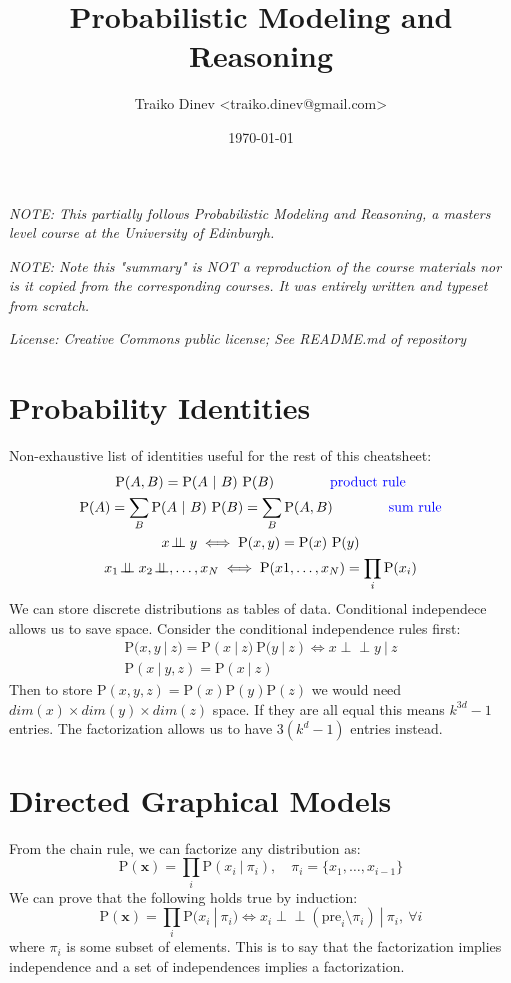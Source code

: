 \documentclass{article}
\title{Probabilistic Modeling and Reasoning}
\date{\today}
\author{Traiko Dinev \textless traiko.dinev@gmail.com\textgreater}
\newcommand{\prob}{\text{P}}
\newcommand{\pr}{\prob}
\newcommand{\pre}{\text{pre}_i}
\renewcommand{\vec}[1]{\mathbf{#1}}
\newcommand{\bx}{\vec{x}}
\newcommand{\giv}{\ |\ }
\newcommand{\blue}[1]{\textcolor{blue}{#1}}
\newcommand\indep{\!\perp\!\!\!\perp}
\begin{document}
\maketitle
\textit{NOTE: This partially follows Probabilistic Modeling and Reasoning, a masters level course at the University of Edinburgh.}

\textit{NOTE: Note this "summary" is NOT a reproduction of the course materials nor is it copied from the corresponding courses. It was entirely written and typeset from scratch.}

\textit{License: Creative Commons public license; See README.md of repository}

\section{Probability Identities}
Non-exhaustive list of identities useful for the rest of this cheatsheet:
% 
\begin{gather*}
    \pr(A,B) = \pr(A \giv B)\ \pr(B) 
        \qquad \tag*{\blue{product rule}}\\
    \pr(A) = \sum_B \pr(A \giv B)\ \pr(B) = 
        \sum_B \pr(A,B) \qquad \tag*{\blue{sum rule}} \\
    x \indep y \iff \pr(x, y) = \pr(x)\ \pr(y) \\
    x_1 \indep x_2 \indep, \dots , x_N \iff 
        \pr(x1, \dots, x_N)  = \prod_i \pr(x_i)
\end{gather*}
% 
We can store discrete distributions as tables of data. Conditional independece allows us to save space. Consider the conditional independence rules first:
% 
\begin{gather*}
    \pr(x, y \giv z) = \pr(x \giv z)\ \pr(y \giv z)
        \iff x \indep y \giv z \\
    \pr(x \giv y, z) = \pr(x \giv z)
\end{gather*}
% 
Then to store $\pr(x, y, z) = \pr(x) \pr(y) \pr(z)$ we would need $dim(x) \times dim(y) \times dim(z)$ space. If they are all equal this means $k^{3d} - 1$ entries. The factorization allows us to have $3(k^d - 1)$ entries instead.

\section{Directed Graphical Models}
From the chain rule, we can factorize any distribution as:
% 
\begin{equation*}
    \pr(\bx) = \prod_i \pr(x_i \giv \pi_i), 
        \quad \pi_i = \{ x_1, \dots, x_{i-1} \}
\end{equation*}
%
We can prove that the following holds true by induction:
\begin{equation*}
    \pr(\bx) = \prod_i \pr(x_i \giv \pi_i)
        \iff x_i \indep (\pre \setminus \pi_i) \giv \pi_i, \ \forall i
\end{equation*}
% 
where $\pi_i$ is some subset of elements. This is to say that the factorization implies independence and a set of independences implies a factorization.
\end{document}
